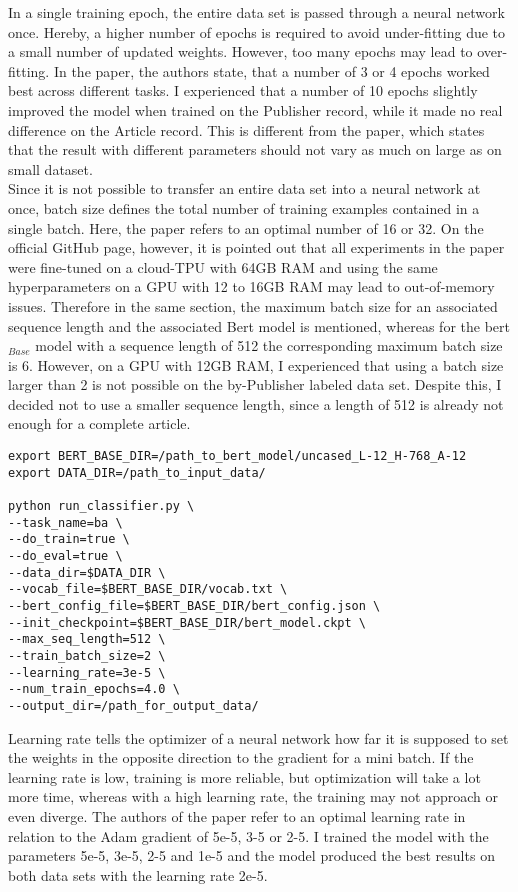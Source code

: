 \documentclass[a4paper, 11pt,titlepage,oneside,openany]{book}
\begin{document}
\indent In a  single training epoch, the entire data set is passed through a neural network once. Hereby, a higher number of epochs is required to avoid under-fitting due to a small number of updated weights. However, too many epochs may lead to over-fitting. In the paper, the authors state, that a number of  3 or 4 epochs worked best across different tasks. I experienced that a number of 10 epochs slightly improved the model when trained on the Publisher record, while it made no real difference on the Article record. This is different from the paper, which states that the result with different parameters should not vary as much on large as on small dataset.  \\
\indent Since it is not possible to transfer an entire data set into a neural network at once, batch size defines the total number of training examples contained in a single batch. Here, the paper refers  to an optimal number of 16 or 32. On the official GitHub page, however, it is pointed out that all experiments in the paper were fine-tuned on a cloud-TPU with 64GB RAM and using the same hyperparameters  on a GPU with 12 to 16GB RAM may lead to out-of-memory issues. Therefore in the same section, the maximum batch size for an associated sequence length and the associated Bert model is mentioned, whereas for the \gls{bert}$_{Base}$ model with a sequence length of 512 the corresponding maximum batch size is 6. However, on
a GPU with 12GB RAM, I  experienced that using a batch size larger than 2 is not possible on the by-Publisher labeled data set. Despite this, I decided not to use a smaller sequence length, since a length of 512 is already not enough for a complete article. 
\newpage
\begin{lstlisting}[caption=run\_classifier prompt with FLAGS]
export BERT_BASE_DIR=/path_to_bert_model/uncased_L-12_H-768_A-12
export DATA_DIR=/path_to_input_data/

python run_classifier.py \
--task_name=ba \
--do_train=true \
--do_eval=true \
--data_dir=$DATA_DIR \
--vocab_file=$BERT_BASE_DIR/vocab.txt \
--bert_config_file=$BERT_BASE_DIR/bert_config.json \
--init_checkpoint=$BERT_BASE_DIR/bert_model.ckpt \
--max_seq_length=512 \
--train_batch_size=2 \
--learning_rate=3e-5 \
--num_train_epochs=4.0 \
--output_dir=/path_for_output_data/
\end{lstlisting}
\indent Learning rate tells the optimizer of a neural network how far it is supposed to set the weights in the opposite direction to the gradient for a mini batch. If the learning rate is low, training is more reliable, but  optimization will take a lot more time, whereas with a high learning rate, the training may not approach or even diverge. The authors of the paper refer to an optimal learning rate in relation to the Adam gradient \cite{adam} of 5e-5, 3-5 or 2-5. I trained the model with the parameters 5e-5, 3e-5, 2-5 and 1e-5 and the model produced the best results on both data sets with the learning rate 2e-5. 
\end{document}
